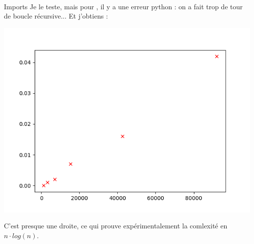 \\

Imports
Je le teste, mais pour , il y a une erreur python :
on a fait trop de tour de boucle récursive...
Et j'obtiens :
\begin{center}
  \includegraphics[scale=0.5]{section-01/q6/4.png}
\end{center}
C'est presque une droite, ce qui prouve expérimentalement la comlexité en
$n\cdot log(n)$.
